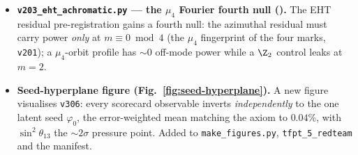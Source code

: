 \documentclass[11pt]{article}
\begin{document}
\begin{itemize}
  split is made an explicit anti-numerology firewall rule: $\phi=2\cos(\pi/5)\in\mathbb Q(\sqrt5)$ is the
  \emph{static} carrier ($\Z/5$) field, every \emph{dynamic} rate is rational ($\mathbb Q$, the $\Z/6$ hand), so a
  dynamic rate explained by $\phi$ is a cross-field false friend (\texttt{v314}/\texttt{v315}).
\item \textbf{\texttt{v203\_eht\_achromatic.py} --- the $\mu_4$ Fourier fourth null (\mX).} The EHT residual
  pre-registration gains a fourth null: the azimuthal residual must carry power \emph{only} at $m\equiv0\bmod4$
  (the $\mu_4$ fingerprint of the four marks, \texttt{v201}); a $\mu_4$-orbit profile has $\sim0$ off-mode power
  while a $\Z_2$ control leaks at $m=2$.
\item \textbf{Seed-hyperplane figure (Fig.~\ref{fig:seed-hyperplane}).} A new figure visualises \texttt{v306}:
  every scorecard observable inverts \emph{independently} to the one latent seed $\varphi_0$, the error-weighted
  mean matching the axiom to $0.04\%$, with $\sin^2\theta_{13}$ the $\sim2\sigma$ pressure point. Added to
  \texttt{make\_figures.py}, \texttt{tfpt\_5\_redteam} and the manifest.
\end{itemize}
\end{document}
